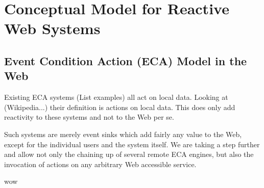 
\chapter{Conceptual Model for Reactive Web Systems}
%


\section{Event Condition Action (ECA) Model in the Web}
%

Existing ECA systems (List examples) all act on local data.
Looking at (Wikipedia...) their definition is actions on local data.
This does only add reactivity to these systems and not to the Web per se.

Such systems are merely event sinks which add fairly any value to the Web, except for the individual users and the system itself.
We are taking a step further and allow not only the chaining up of several remote ECA engines, but also the invocation of actions on any arbitrary Web accessible service.


\newpage
wow